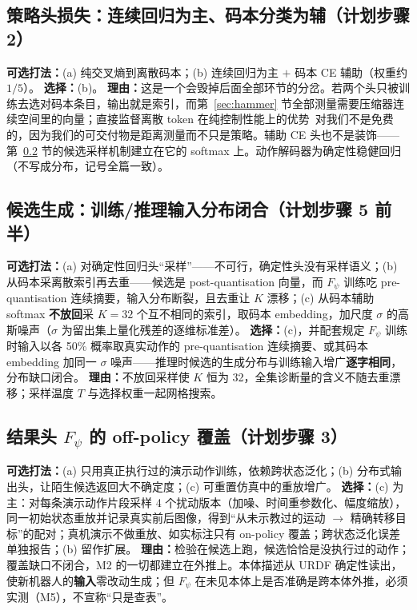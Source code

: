 \documentclass[11pt,a4paper]{ctexart}
\begin{document}
\subsection{策略头损失：连续回归为主、码本分类为辅（计划步骤 2）}

\textbf{可选打法：}(a) 纯交叉熵到离散码本；(b) 连续回归为主 $+$ 码本 CE 辅助（权重约 $1/5$）。\quad
\textbf{选择：}(b)。\quad
\textbf{理由：}这是一个会毁掉后面全部环节的分岔。若两个头只被训练去选对码本条目，输出就是索引，而第~\ref{sec:hammer} 节全部测量需要压缩器连续空间里的向量；直接监督离散 token 在纯控制性能上的优势~\cite{pixels2tokens}对我们不是免费的，因为我们的可交付物是距离测量而不只是策略。辅助 CE 头也不是装饰——第~\ref{sec:sampling} 节的候选采样机制建立在它的 softmax 上。动作解码器为确定性稳健回归（不写成分布，记号全篇一致）。

\subsection{候选生成：训练/推理输入分布闭合（计划步骤 5 前半）}\label{sec:sampling}

\textbf{可选打法：}(a) 对确定性回归头``采样''——不可行，确定性头没有采样语义；(b) 从码本采离散索引再去重——候选是 post-quantisation 向量，而 $F_\psi$ 训练吃 pre-quantisation 连续摘要，输入分布断裂，且去重让 $K$ 漂移；(c) 从码本辅助 softmax \textbf{不放回}采 $K{=}32$ 个互不相同的索引，取码本 embedding，加尺度 $\sigma$ 的高斯噪声（$\sigma$ 为留出集上量化残差的逐维标准差）。\quad
\textbf{选择：}(c)，并配套规定 $F_\psi$ 训练时输入以各 50\% 概率取真实动作的 pre-quantisation 连续摘要、或其码本 embedding 加同一 $\sigma$ 噪声——推理时候选的生成分布与训练输入增广\textbf{逐字相同}，分布缺口闭合。\quad
\textbf{理由：}不放回采样使 $K$ 恒为 32，全集诊断量的含义不随去重漂移；采样温度 $T$ 与选择权重一起网格搜索。

\subsection{结果头 $F_\psi$ 的 off-policy 覆盖（计划步骤 3）}

\textbf{可选打法：}(a) 只用真正执行过的演示动作训练，依赖跨状态泛化；(b) 分布式输出头，让陌生候选返回大不确定度；(c) 可重置仿真中的重放增广。\quad
\textbf{选择：}(c) 为主：对每条演示动作片段采样 4 个扰动版本（加噪、时间重参数化、幅度缩放），同一初始状态重放并记录真实前后图像，得到``从未示教过的运动 $\to$ 精确转移目标''的配对；真机演示不做重放、如实标注只有 on-policy 覆盖；跨状态泛化误差单独报告；(b) 留作扩展。\quad
\textbf{理由：}检验在候选上跑，候选恰恰是没执行过的动作；覆盖缺口不闭合，M2 的一切都建立在外推上。本体描述从 URDF 确定性读出，使新机器人的\textbf{输入}零改动生成；但 $F_\psi$ 在未见本体上是否准确是跨本体外推，必须实测（M5），不宣称``只是查表''。
\end{document}
